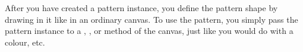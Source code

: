 After you have created a pattern instance, you define the pattern
shape by drawing in it like in an ordinary canvas. To use the pattern,
you simply pass the pattern instance to a ,
,  or  method of the
canvas, just like you would do with a colour, etc.



